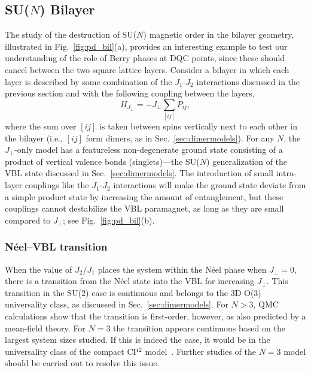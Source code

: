 \documentclass[10pt,pre,aps,twocolumn,showpacs,subscriptaddresses,floatfix]{revtex4}
\begin{document}
\subsection{SU($N$) Bilayer}
\label{ss:bilN}

The study of the destruction of SU($N$) magnetic order in the bilayer geometry, illustrated in Fig.~\ref{fig:pd_bil}(a), provides an interesting 
example to test our understanding of the role of Berry phases at DQC points, since these should cancel between the two square lattice layers. 
Consider a bilayer in which each layer is described by some combination of the $J_1$-$J_2$ interactions discussed in the previous section and with
the following coupling between the layers,
\begin{equation}
 H_{J_\perp} = -J_\perp \sum_{[ij]} P_{ij},
\end{equation}
where the sum over $[ij]$ is taken between spins vertically next to each other in the bilayer (i.e., $[ij]$ form dimers, as in Sec.~\ref{sec:dimermodels}). For 
any $N$, the $J_\perp$-only model has a featureless non-degenerate ground state consisting of a product of vertical valence bonds (singlets)---the SU($N$)
generalization of the VBL state discussed in Sec.~\ref{sec:dimermodels}. The introduction of small intra-layer couplings like the $J_1$-$J_2$ interactions will 
make the ground state deviate from a simple product state by increasing the amount of entanglement, but these couplings cannot destabilize the VBL paramagnet,
as long as they are small compared to $J_\perp$; see Fig.~\ref{fig:pd_bil}(b). 

\subsubsection{N\'eel--VBL transition}

When the value of $J_2/J_1$ places the system within the N\'eel phase when $J_\perp=0$, there is a transition from the N\'eel state into the VBL for increasing 
$J_\perp$. This transition in the SU($2$) case is continuous and belongs to the 3D O($3$) universality class, as discussed in Sec.~\ref{sec:dimermodels}. For $N>3$, 
QMC calculations \cite{kaul2012:sun_bil} show that the transition is first-order, however, as also predicted by a mean-field theory. For $N=3$ the transition appears 
continuous based on the largest system sizes studied. If this is indeed the case, it would be in the universality class of the compact CP$^2$ model~\cite{Nahum11}. 
Further studies of the $N=3$ model should be carried out to resolve this issue.
\end{document}
